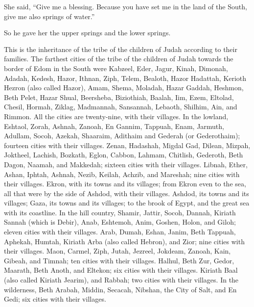 She said, ``Give me a blessing. Because you have set me in
the land of the South, give me also springs of water.''

So he gave her the upper springs and the lower springs.

 This is the inheritance of the tribe of the children of
Judah according to their families.  The farthest cities of
the tribe of the children of Judah towards the border of Edom in the
South were Kabzeel, Eder, Jagur,  Kinah, Dimonah, Adadah,
 Kedesh, Hazor, Ithnan,  Ziph, Telem, Bealoth,
 Hazor Hadattah, Kerioth Hezron (also called Hazor),
 Amam, Shema, Moladah,  Hazar Gaddah, Heshmon,
Beth Pelet,  Hazar Shual, Beersheba, Biziothiah,
 Baalah, Iim, Ezem,  Eltolad, Chesil, Hormah,
 Ziklag, Madmannah, Sansannah,  Lebaoth,
Shilhim, Ain, and Rimmon. All the cities are twenty-nine, with their
villages.  In the lowland, Eshtaol, Zorah, Ashnah,
 Zanoah, En Gannim, Tappuah, Enam,  Jarmuth,
Adullam, Socoh, Azekah,  Shaaraim, Adithaim and Gederah (or
Gederothaim); fourteen cities with their villages.  Zenan,
Hadashah, Migdal Gad,  Dilean, Mizpah, Joktheel,
 Lachish, Bozkath, Eglon,  Cabbon, Lahmam,
Chitlish,  Gederoth, Beth Dagon, Naamah, and Makkedah;
sixteen cities with their villages.  Libnah, Ether, Ashan,
 Iphtah, Ashnah, Nezib,  Keilah, Achzib, and
Mareshah; nine cities with their villages.  Ekron, with its
towns and its villages;  from Ekron even to the sea, all
that were by the side of Ashdod, with their villages. 
Ashdod, its towns and its villages; Gaza, its towns and its villages; to
the brook of Egypt, and the great sea with its coastline. 
In the hill country, Shamir, Jattir, Socoh,  Dannah,
Kiriath Sannah (which is Debir),  Anab, Eshtemoh, Anim,
 Goshen, Holon, and Giloh; eleven cities with their
villages.  Arab, Dumah, Eshan,  Janim, Beth
Tappuah, Aphekah,  Humtah, Kiriath Arba (also called
Hebron), and Zior; nine cities with their villages.  Maon,
Carmel, Ziph, Jutah,  Jezreel, Jokdeam, Zanoah,
 Kain, Gibeah, and Timnah; ten cities with their villages.
 Halhul, Beth Zur, Gedor,  Maarath, Beth
Anoth, and Eltekon; six cities with their villages. 
Kiriath Baal (also called Kiriath Jearim), and Rabbah; two cities with
their villages.  In the wilderness, Beth Arabah, Middin,
Secacah,  Nibshan, the City of Salt, and En Gedi; six
cities with their villages.

